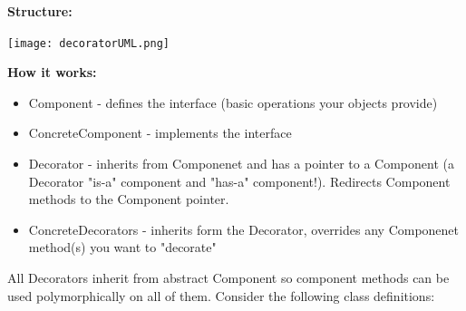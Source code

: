 \documentclass[english, 11pt]{article}
\begin{document}
\textbf{Structure:}

\begin{center}
  \texttt{[image: decoratorUML.png]}
\end{center}

\textbf{How it works:} \\

\begin{itemize}
  \item Component - defines the interface (basic operations your objects provide)
  \item ConcreteComponent - implements the interface
  \item Decorator - inherits from Componenet and has a pointer to a Component (a Decorator "is-a" component and "has-a" component!). Redirects Component methods to the Component pointer.
  \item ConcreteDecorators - inherits form the Decorator, overrides any Componenet method(s) you want to "decorate"
\end{itemize}

All Decorators inherit from abstract Component so component methods can be used polymorphically on all of them. Consider the following class definitions:
\end{document}
